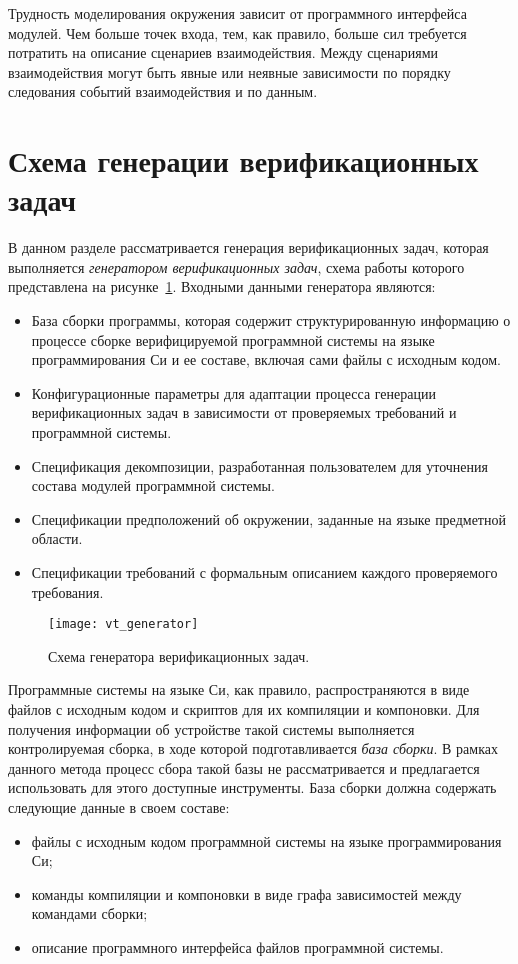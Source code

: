 Трудность моделирования окружения зависит от программного интерфейса модулей.
Чем больше точек входа, тем, как правило, больше сил требуется потратить на описание сценариев взаимодействия.
Между сценариями взаимодействия могут быть явные или неявные зависимости по порядку следования событий взаимодействия и по данным.

\section{Схема генерации верификационных задач}

В данном разделе рассматривается генерация верификационных задач, которая выполняется \textit{генератором верификационных задач}, схема работы которого представлена на рисунке~\ref{figure:vt_generator}.
Входными данными генератора являются:
\begin{itemize}
    \item База сборки программы, которая содержит структурированную информацию о процессе сборке верифицируемой программной системы на языке программирования Си и ее составе, включая сами файлы с исходным кодом.
    \item Конфигурационные параметры для адаптации процесса генерации верификационных задач в зависимости от проверяемых требований и программной системы.
    \item Спецификация декомпозиции, разработанная пользователем для уточнения состава модулей программной системы.
    \item Спецификации предположений об окружении, заданные на языке предметной области.
    \item Спецификации требований с формальным описанием каждого проверяемого требования.
\end{itemize}

\begin{figure}
\centering
\texttt{[image: vt\_generator]}
\caption{Схема генератора верификационных задач.}
\label{figure:vt_generator}
\end{figure}

Программные системы на языке Си, как правило, распространяются в виде файлов с исходным кодом и скриптов для их компиляции и компоновки.
Для получения информации об устройстве такой системы выполняется контролируемая сборка, в ходе которой подготавливается \textit{база сборки}.
В рамках данного метода процесс сбора такой базы не рассматривается и предлагается использовать для этого доступные инструменты.
База сборки должна содержать следующие данные в своем составе:
\begin{itemize}
    \item файлы с исходным кодом программной системы на языке программирования Си;
    \item команды компиляции и компоновки в виде графа зависимостей между командами сборки;
    \item описание программного интерфейса файлов программной системы.
    \end{itemize}
    
